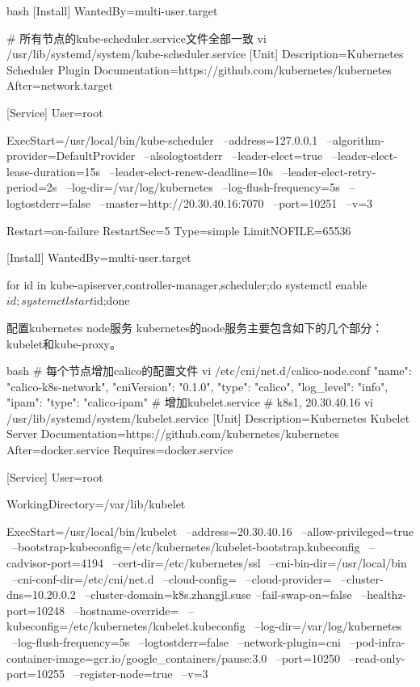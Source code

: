 \begin{outline}[enumerate]
\begin{code-in-enumerate}{bash}
[Install]
WantedBy=multi-user.target

# 所有节点的kube-scheduler.service文件全部一致
vi /usr/lib/systemd/system/kube-scheduler.service
[Unit]
Description=Kubernetes Scheduler Plugin
Documentation=https://github.com/kubernetes/kubernetes
After=network.target

[Service]
User=root

ExecStart=/usr/local/bin/kube-scheduler \
    --address=127.0.0.1 \
    --algorithm-provider=DefaultProvider \
    --alsologtostderr \
    --leader-elect=true \
    --leader-elect-lease-duration=15s \
    --leader-elect-renew-deadline=10s \
    --leader-elect-retry-period=2s \
    --log-dir=/var/log/kubernetes \
    --log-flush-frequency=5s \
    --logtostderr=false \
    --master=http://20.30.40.16:7070 \
    --port=10251 \
    --v=3

Restart=on-failure
RestartSec=5
Type=simple
LimitNOFILE=65536

[Install]
WantedBy=multi-user.target

for id in kube-{apiserver,controller-manager,scheduler};do systemctl enable $id;systemctl start $id;done
\end{code-in-enumerate}

  \1 配置kubernetes node服务
kubernetes的node服务主要包含如下的几个部分：kubelet和kube-proxy。
\begin{code-in-enumerate}{bash}
# 每个节点增加calico的配置文件
vi /etc/cni/net.d/calico-node.conf
{
    "name": "calico-k8s-network",
    "cniVersion": "0.1.0",
    "type": "calico",
    "log_level": "info",
    "ipam": {
        "type": "calico-ipam"
    }
}
# 增加kubelet.service
# k8s1, 20.30.40.16
vi /usr/lib/systemd/system/kubelet.service
[Unit]
Description=Kubernetes Kubelet Server
Documentation=https://github.com/kubernetes/kubernetes
After=docker.service
Requires=docker.service

[Service]
User=root

WorkingDirectory=/var/lib/kubelet

ExecStart=/usr/local/bin/kubelet \
    --address=20.30.40.16 \
    --allow-privileged=true \
    --bootstrap-kubeconfig=/etc/kubernetes/kubelet-bootstrap.kubeconfig \
    --cadvisor-port=4194 \
    --cert-dir=/etc/kubernetes/ssl \
    --cni-bin-dir=/usr/local/bin \
    --cni-conf-dir=/etc/cni/net.d \
    --cloud-config= \
    --cloud-provider= \
    --cluster-dns=10.20.0.2 \
    --cluster-domain=k8s.zhangjl.suse\
    --fail-swap-on=false \
    --healthz-port=10248 \
    --hostname-override= \
    --kubeconfig=/etc/kubernetes/kubelet.kubeconfig \
    --log-dir=/var/log/kubernetes \
    --log-flush-frequency=5s \
    --logtostderr=false \
    --network-plugin=cni \
    --pod-infra-container-image=gcr.io/google_containers/pause:3.0 \
    --port=10250 \
    --read-only-port=10255 \
    --register-node=true \
    --v=3


\end{code-in-enumerate}
\end{outline}
